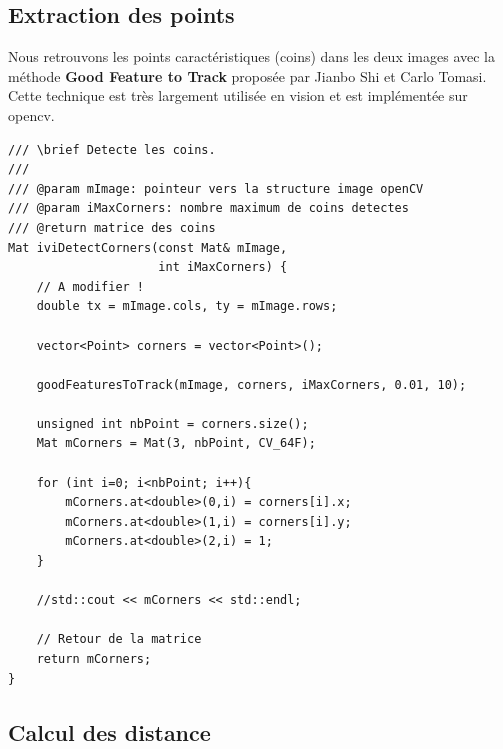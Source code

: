 \documentclass[a4paper,11pt]{article}
\begin{document}
\subsection{Extraction des points}

Nous retrouvons les points caractéristiques (coins) dans les deux images avec la méthode 
\textbf{Good Feature to Track} proposée par Jianbo Shi et Carlo Tomasi. Cette technique est 
très largement utilisée en vision et est implémentée sur opencv.

\begin{lstlisting}[caption=Fonction d'extraction des coins]
/// \brief Detecte les coins.
///
/// @param mImage: pointeur vers la structure image openCV
/// @param iMaxCorners: nombre maximum de coins detectes
/// @return matrice des coins
Mat iviDetectCorners(const Mat& mImage,
                     int iMaxCorners) {
    // A modifier !
    double tx = mImage.cols, ty = mImage.rows;

    vector<Point> corners = vector<Point>();

    goodFeaturesToTrack(mImage, corners, iMaxCorners, 0.01, 10);

    unsigned int nbPoint = corners.size();
    Mat mCorners = Mat(3, nbPoint, CV_64F);

    for (int i=0; i<nbPoint; i++){
        mCorners.at<double>(0,i) = corners[i].x;
        mCorners.at<double>(1,i) = corners[i].y;
        mCorners.at<double>(2,i) = 1;
    }

    //std::cout << mCorners << std::endl;

    // Retour de la matrice
    return mCorners;
}
\end{lstlisting}

\begin{figure}[H]
  \centering
\end{figure}

\subsection{Calcul des distance}
\end{document}
